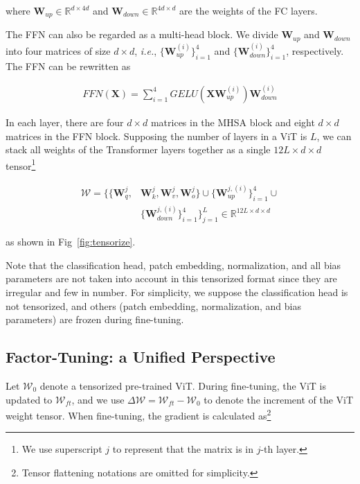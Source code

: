 where $\boldsymbol{W}_{up}\in \mathbb{R}^{d\times 4d}$ and $\boldsymbol{W}_{down}\in \mathbb{R}^{4d\times d}$ are the weights of the FC layers.

The FFN can also be regarded as a multi-head block. We divide $\boldsymbol{W}_{up}$ and $\boldsymbol{W}_{down}$ into four matrices of size $d\times d$, \emph{i.e.}, $\{\boldsymbol{W}_{up}^{(i)}\}^{4}_{i=1}$ and $\{\boldsymbol{W}_{down}^{(i)}\}^{4}_{i=1}$, respectively. The FFN can be rewritten as

\begin{equation}
\begin{aligned}
    \textit{FFN}(\boldsymbol{X})=\sum_{i=1}^4\textit{GELU}\left(\boldsymbol{X}\boldsymbol{W}_{up}^{(i)}\right)\boldsymbol{W}_{down}^{(i)}
\end{aligned}    
\end{equation}

In each layer, there are four $d\times d$ matrices in the MHSA block and eight $d\times d$ matrices in the FFN block. Supposing the number of layers in a ViT is $L$, we can stack all weights of the Transformer layers together as a single $12L\times d\times d$ tensor\footnote{We use superscript $j$ to represent that the matrix is in $j$-th layer.}

\begin{equation}
\begin{aligned}
    \boldsymbol{\mathcal{W}}=\big\{\{\boldsymbol{W}_q^j,& \boldsymbol{W}_k^j, \boldsymbol{W}_v^j, \boldsymbol{W}_o^j\}\cup \{\boldsymbol{W}_{up}^{j,(i)}\}^{4}_{i=1}\cup\\ &\{\boldsymbol{W}_{down}^{j,(i)}\}^{4}_{i=1} \big\}_{j=1}^{L}\in \mathbb{R}^{12L\times d\times d}
\end{aligned}    
\end{equation}

as shown in Fig~\ref{fig:tensorize}.

Note that the classification head, patch embedding, normalization, and all bias parameters are not taken into account in this tensorized format since they are irregular and few in number. For simplicity, we suppose the classification head is not tensorized, and others (patch embedding, normalization, and bias parameters) are frozen during fine-tuning. 

\subsection{Factor-Tuning: a Unified Perspective} Let $\boldsymbol{\mathcal{W}}_0$ denote a tensorized pre-trained ViT. During fine-tuning, the ViT is updated to $\boldsymbol{\mathcal{W}}_{ft}$, and we use $\Delta\boldsymbol{\mathcal{W}}=\boldsymbol{\mathcal{W}}_{ft}-\boldsymbol{\mathcal{W}}_{0}$ to denote the {increment} of the ViT weight tensor. When fine-tuning, the gradient is calculated as\footnote{Tensor flattening notations are omitted for simplicity.}

